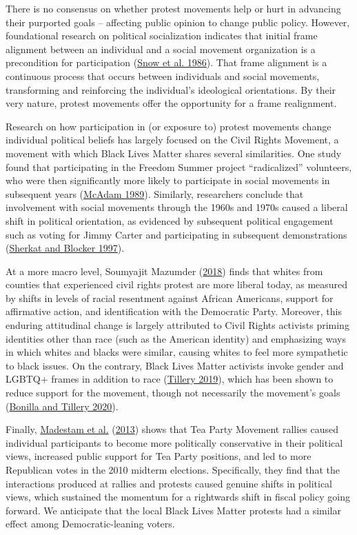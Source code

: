 \documentclass[
  12pt,
]{article}
\begin{document}
There is no consensus on whether protest movements help or hurt in advancing their purported goals -- affecting public opinion to change public policy. However, foundational research on political socialization indicates that initial frame alignment between an individual and a social movement organization is a precondition for participation (\protect\hyperlink{ref-Snow1986}{Snow et al. 1986}). That frame alignment is a continuous process that occurs between individuals and social movements, transforming and reinforcing the individual's ideological orientations. By their very nature, protest movements offer the opportunity for a frame realignment.

Research on how participation in (or exposure to) protest movements change individual political beliefs has largely focused on the Civil Rights Movement, a movement with which Black Lives Matter shares several similarities. One study found that participating in the Freedom Summer project ``radicalized'' volunteers, who were then significantly more likely to participate in social movements in subsequent years (\protect\hyperlink{ref-McAdam1989}{McAdam 1989}). Similarly, researchers conclude that involvement with social movements through the 1960s and 1970s caused a liberal shift in political orientation, as evidenced by subsequent political engagement such as voting for Jimmy Carter and participating in subsequent demonstrations (\protect\hyperlink{ref-Sherkat1997}{Sherkat and Blocker 1997}).

At a more macro level, Soumyajit Mazumder (\protect\hyperlink{ref-Mazumder2018}{2018}) finds that whites from counties that experienced civil rights protest are more liberal today, as measured by shifts in levels of racial resentment against African Americans, support for affirmative action, and identification with the Democratic Party. Moreover, this enduring attitudinal change is largely attributed to Civil Rights activists priming identities other than race (such as the American identity) and emphasizing ways in which whites and blacks were similar, causing whites to feel more sympathetic to black issues. On the contrary, Black Lives Matter activists invoke gender and LGBTQ+ frames in addition to race (\protect\hyperlink{ref-Tillery2019}{Tillery 2019}), which has been shown to reduce support for the movement, though not necessarily the movement's goals (\protect\hyperlink{ref-Bonilla2020}{Bonilla and Tillery 2020}).

Finally, \protect\hyperlink{ref-Madestam2013}{Madestam et al.} (\protect\hyperlink{ref-Madestam2013}{2013}) shows that Tea Party Movement rallies caused individual participants to become more politically conservative in their political views, increased public support for Tea Party positions, and led to more Republican votes in the 2010 midterm elections. Specifically, they find that the interactions produced at rallies and protests caused genuine shifts in political views, which sustained the momentum for a rightwards shift in fiscal policy going forward. We anticipate that the local Black Lives Matter protests had a similar effect among Democratic-leaning voters.
\end{document}
